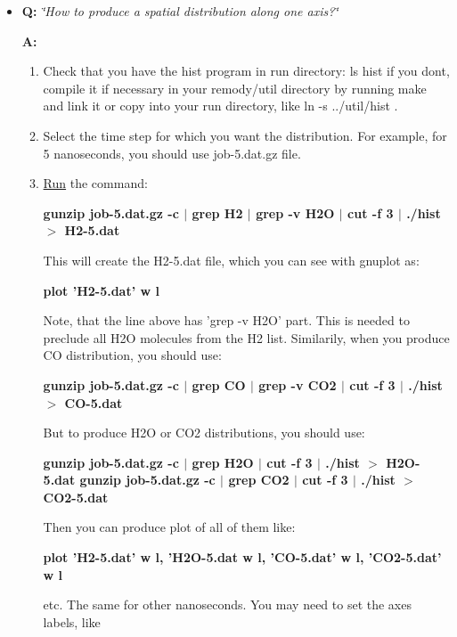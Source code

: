 {\tt \begin{itemize}
\item {\bf Q:} {\em \char`\"{}How to produce a spatial distribution along one axis?\char`\"{}\/} \par
{\bf A:}\begin{enumerate}
\item Check that you have the hist program in run directory: ls hist if you dont, compile it if necessary in your remody/util directory by running make and link it or copy into your run directory, like ln -s ../util/hist .\par
\item Select the time step for which you want the distribution. For example, for 5 nanoseconds, you should use job-5.dat.gz file.\item \hyperlink{namespaceRun}{Run} the command: \par
\par
{\bf  gunzip job-5.dat.gz -c $|$ grep H2 $|$ grep -v H2O $|$ cut -f 3 $|$ ./hist $>$ H2-5.dat }\par
\par
 This will create the H2-5.dat file, which you can see with gnuplot as: \par
\par
{\bf  plot 'H2-5.dat' w l }\par
\par
 Note, that the line above has 'grep -v H2O' part. This is needed to preclude all H2O molecules from the H2 list. Similarily, when you produce CO distribution, you should use: \par
\par
{\bf  gunzip job-5.dat.gz -c $|$ grep CO $|$ grep -v CO2 $|$ cut -f 3 $|$ ./hist $>$ CO-5.dat }\par
\par
 But to produce H2O or CO2 distributions, you should use: \par
\par
{\bf  gunzip job-5.dat.gz -c $|$ grep H2O $|$ cut -f 3 $|$ ./hist $>$ H2O-5.dat gunzip job-5.dat.gz -c $|$ grep CO2 $|$ cut -f 3 $|$ ./hist $>$ CO2-5.dat }\par
\par
 Then you can produce plot of all of them like: \par
\par
{\bf  plot 'H2-5.dat' w l, 'H2O-5.dat w l, 'CO-5.dat' w l, 'CO2-5.dat' w l }\par
\par
 etc. The same for other nanoseconds. You may need to set the axes labels, like \par

\end{enumerate}
\end{itemize}}
